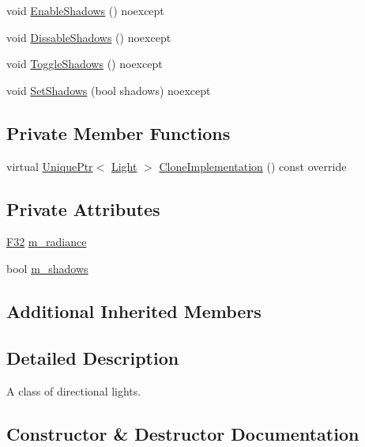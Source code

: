 \begin{DoxyCompactItemize}
\item 
void \hyperlink{classmage_1_1_directional_light_a36436d5d99ccf6a0e49e81f26c3f9bc7}{Enable\+Shadows} () noexcept
\item 
void \hyperlink{classmage_1_1_directional_light_addd4803dee85892dfd57f51e155c6572}{Dissable\+Shadows} () noexcept
\item 
void \hyperlink{classmage_1_1_directional_light_a1c15d8e42526ed5ae7568cff5c7b25e0}{Toggle\+Shadows} () noexcept
\item 
void \hyperlink{classmage_1_1_directional_light_ab70b4298dc6616dbe22446e8e3298424}{Set\+Shadows} (bool shadows) noexcept
\end{DoxyCompactItemize}
\subsection*{Private Member Functions}
\begin{DoxyCompactItemize}
\item 
virtual \hyperlink{namespacemage_a3316d7143a973e37adf1110f2e80ca31}{Unique\+Ptr}$<$ \hyperlink{classmage_1_1_light}{Light} $>$ \hyperlink{classmage_1_1_directional_light_a122d3dcd7633a85ef8a85e7d768da36d}{Clone\+Implementation} () const override
\end{DoxyCompactItemize}
\subsection*{Private Attributes}
\begin{DoxyCompactItemize}
\item 
\hyperlink{namespacemage_aa97e833b45f06d60a0a9c4fc22ae02c0}{F32} \hyperlink{classmage_1_1_directional_light_aedba48c9e2590284f804ba7cc6225ec3}{m\+\_\+radiance}
\item 
bool \hyperlink{classmage_1_1_directional_light_a607a3dc01ee180f2044fe154c2b73903}{m\+\_\+shadows}
\end{DoxyCompactItemize}
\subsection*{Additional Inherited Members}


\subsection{Detailed Description}
A class of directional lights. 

\subsection{Constructor \& Destructor Documentation}
\hypertarget{classmage_1_1_directional_light_aa773f5b1f922b300ec91c0f7fa064b68}{}\label{classmage_1_1_directional_light_aa773f5b1f922b300ec91c0f7fa064b68} 

